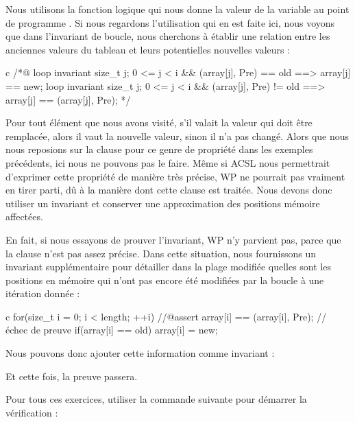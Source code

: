 

Nous utilisons la fonction logique  qui
nous donne la valeur de la variable  au point de programme
. Si nous regardons l'utilisation qui en est faite ici, nous
voyons que dans l'invariant de boucle, nous cherchons à établir une relation
entre les anciennes valeurs du tableau et leurs potentielles nouvelles valeurs :


\begin{CodeBlock}{c}
/*@
  loop invariant \forall size_t j; 0 <= j < i && \at(array[j], Pre) == old
                   ==> array[j] == new;
  loop invariant \forall size_t j; 0 <= j < i && \at(array[j], Pre) != old
                   ==> array[j] == \at(array[j], Pre);
*/
\end{CodeBlock}


Pour tout élément que nous avons visité, s'il valait la valeur qui doit être
remplacée, alors il vaut la nouvelle valeur, sinon il n'a pas changé. Alors que
nous nous reposions sur la clause  pour ce genre de propriété
dans les exemples précédents, ici nous ne pouvons pas le faire. Même si ACSL nous
permettrait d'exprimer cette propriété de manière très précise, WP ne pourrait pas
vraiment en tirer parti, dû à la manière dont cette clause est traitée. Nous devons
donc utiliser un invariant et conserver une approximation des positions mémoire
affectées.


En fait, si nous essayons de prouver l'invariant, WP n'y parvient pas, parce que
la clause  n'est pas assez précise. Dans cette situation,
nous fournissons un invariant supplémentaire pour détailler dans la plage modifiée
quelles sont les positions en mémoire qui n'ont pas encore été modifiées par la
boucle à une itération donnée :


\begin{CodeBlock}{c}
for(size_t i = 0; i < length; ++i){
    //@assert array[i] == \at(array[i], Pre); // échec de preuve
    if(array[i] == old) array[i] = new;
}
\end{CodeBlock}


Nous pouvons donc ajouter cette information comme invariant :




Et cette fois, la preuve passera.




Pour tous ces exercices, utiliser la commande suivante pour démarrer la vérification :

